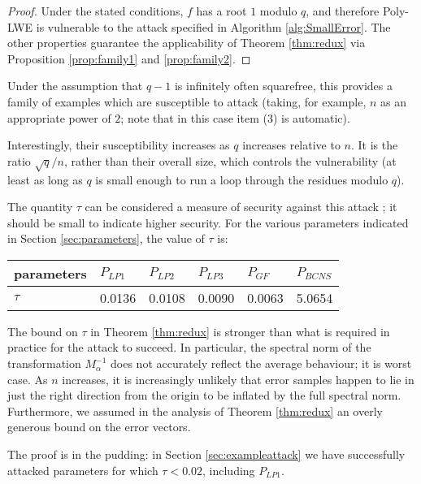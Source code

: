 \documentclass{llncs}
\newcommand{\<}{\langle}
\renewcommand{\>}{\rangle}
\begin{document}
        \begin{proof}
                Under the stated conditions, $f$ has a root $1$ modulo $q$, and therefore Poly-LWE is vulnerable to the attack specified in Algorithm \ref{alg:SmallError}.  The other properties guarantee the applicability of Theorem \ref{thm:redux} via Proposition \ref{prop:family1} and \ref{prop:family2}.
        \end{proof}


        Under the assumption that $q-1$ is infinitely often squarefree, this provides a family of examples which are susceptible to attack (taking, for example, $n$ as an appropriate power of $2$; note that in this case item (3) is automatic).

        Interestingly, their susceptibility increases as $q$ increases relative to $n$.  It is the ratio $\sqrt{q}/n$, rather than their overall size, which controls the vulnerability (at least as long as $q$ is small enough to run a loop through the residues modulo $q$).

        The quantity $\tau$ can be considered a measure of security against this attack ; it should be small to indicate higher security.  For the various parameters indicated in Section \ref{sec:parameters}, the value of $\tau$ is:
\begin{center}
        {\renewcommand{\arraystretch}{1.25}
         \setlength{\tabcolsep}{0.5em}
  \begin{tabular}{| l | l  | l |l |l | l |}
          \hline
          parameters & $P_{LP1}$ & $P_{LP2}$ & $P_{LP3}$ & $P_{GF}$ & $P_{BCNS}$ \\ \hline
          $\tau$ & 0.0136 & 0.0108 & 0.0090 & 0.0063 & 5.0654 \\ \hline
  \end{tabular}}
\end{center}

        The bound on $\tau$ in Theorem \ref{thm:redux} is stronger than what is required in practice for the attack to succeed.  In particular, the spectral norm of the transformation $M_\alpha^{-1}$ does not accurately reflect the average behaviour; it is worst case.  As $n$ increases, it is increasingly unlikely that error samples happen to lie in just the right direction from the origin to be inflated by the full spectral norm.  Furthermore, we assumed in the analysis of Theorem \ref{thm:redux} an overly generous bound on the error vectors.

        The proof is in the pudding:  in Section \ref{sec:exampleattack} we have successfully attacked parameters for which $\tau < 0.02$, including $P_{LP1}$.
\end{document}
